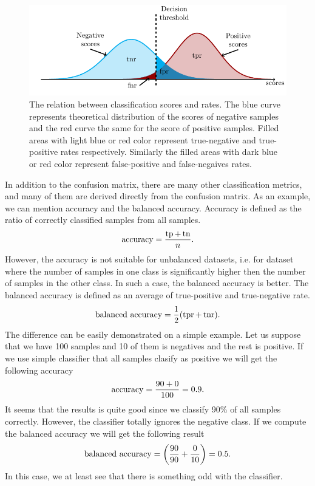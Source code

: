 \begin{figure}
  \centering
  \includegraphics[width=\linewidth]{images/confusion_rates.pdf}
  \caption{The relation between classification scores and  rates. The blue curve represents theoretical distribution of the scores of negative samples and the red curve the same for the score of positive samples. Filled areas with light blue or red color represent true-negative and true-positive rates respectively. Similarly the filled areas with dark blue or red color represent false-positive and false-negaives rates.}
  \label{fig: scores and rates}
\end{figure}
In addition to the confusion matrix, there are many other classification metrics, and many of them are derived directly from the confusion matrix. As an example, we can mention accuracy and the balanced accuracy. Accuracy is defined as the ratio of correctly classified samples from all samples.
\begin{equation*}
  \operatorname{accuracy} = \frac{\operatorname{tp} + \operatorname{tn}}{n}.
\end{equation*}
However, the accuracy is not suitable for unbalanced datasets, i.e. for dataset where the number of samples in one class is significantly higher then the number of samples in the other class. In such a case, the balanced accuracy is better. The balanced accuracy is defined as an average of true-positive and true-negative rate.
\begin{equation*}
  \baccuracy = \frac{1}{2}\Brac{\tpr + \tnr}.
\end{equation*}
The difference can be easily demonstrated on a simple example. Let us suppose that we have 100 samples and 10 of them is negatives and the rest is positive. If we use simple classifier that all samples clasify as positive we will get the following accuracy
\begin{equation*}
  \operatorname{accuracy} = \frac{90 + 0}{100} = 0.9.
\end{equation*}
It seems that the results is quite good since we classify 90\% of all samples correctly. However, the classifier totally ignores the negative class. If we compute the balanced accuracy we will get the following result
\begin{equation*}
  \baccuracy = \Brac{\frac{90}{90} + \frac{0}{10}} = 0.5.
\end{equation*}
In this case, we at least see that there is something odd with the classifier.